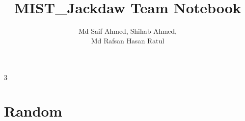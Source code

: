 \documentclass[8pt, a4paper, onesided]{article}
\title{\vspace{-2.5ex}MIST\_Jackdaw Team Notebook}
\author{Md Saif Ahmed, Shihab Ahmed,\\Md Rafsan Hasan Ratul}
\date{}
\begin{document}
\begin{landscape}
\begin{multicols*}{3}

\maketitle
\vspace{-7ex}
\tableofcontents
\pagestyle{fancy}
 
\raggedbottom


\section{Random}
    
\end{multicols*}


\end{landscape}
\end{document}
